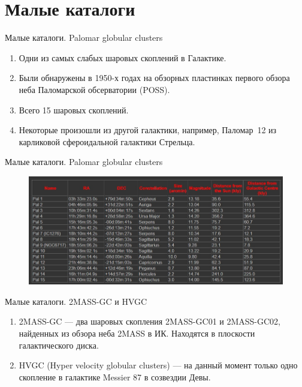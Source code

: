 \documentclass{beamer}
\begin{document}
    \section{Малые каталоги}
    \begin{frame}{Малые каталоги. Palomar globular clusters}
        \begin{enumerate}[]
            \item Одни из самых слабых шаровых скоплений в Галактике.
            \item Были обнаружены в 1950-х годах на обзорных пластинках первого обзора неба Паломарской обсерватории (POSS).
            \item Всего 15 шаровых скоплений.
            \item Некоторые произошли из другой галактики, например, Паломар~12 из карликовой сфероидальной галактики Стрельца.
        \end{enumerate}
    \end{frame}
    \begin{frame}{Малые каталоги. Palomar globular clusters}
        \begin{figure}[h]
            \centering
            \includegraphics[width=0.9\linewidth]{pictures/PGC.jpg}
        \end{figure}
    \end{frame}
    \begin{frame}{Малые каталоги. 2MASS-GC и HVGC}
        \begin{enumerate}[]
            \item 2MASS-GC --- два шаровых скопления 2MASS-GC01 и 2MASS-GC02, найденных из обзора неба 2MASS в ИК. Находятся в плоскости галактического диска.
            \item HVGC (Hyper velocity globular clusters) --- на данный момент только одно скопление в галактике Messier 87 в созвездии Девы. 
        \end{enumerate}
    \end{frame}
\end{document}
